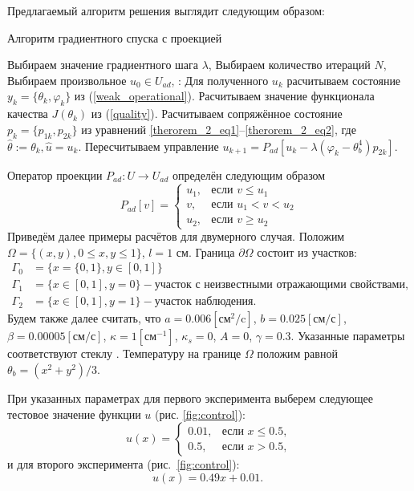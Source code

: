 Предлагаемый алгоритм решения выглядит следующим образом:
\begin{algorithm}[H]
    \caption{Алгоритм градиентного спуска с проекцией}
    \begin{algorithmic}[1]
        \State Выбираем значение градиентного шага $\lambda$,
        \State Выбираем количество итераций $N$,
        \State Выбираем произвольное $u_0 \in U_{ad}$,
            :
            \State Для полученного $u_k$ расчитываем состояние $y_k = \{\theta_k, \varphi_k\}$ из  (\ref{weak_operational}).
            \State Расчитываем значение функционала качества $J(\theta_k)$ из (\ref{quality}).
            \State Расчитываем сопряжённое состояние $p_k=\{p_{1k},p_{2k}\}$ из уравнений \eqref{therorem_2_eq1}--\eqref{therorem_2_eq2}, где $ \hat{\theta} := \theta_k, \hat{u}=u_k$.
            \State Пересчитываем управление $u_{k+1} = P_{ad}\left[ u_k - \lambda (\varphi_k - \theta_b^4)p_{2k} \right]$.
        \EndFor
    \end{algorithmic}\label{alg:algorithm}
\end{algorithm}
Оператор проекции $P_{ad} : U \to U_{ad}$ определён следующим образом
\[
    P_{ad}[v] =
    \begin{cases}
        u_1, & \text{если } v \le u_1 \\
        v, & \text{если } u_1 < v < u_2 \\
        u_2, & \text{если } v \ge u_2
    \end{cases}
\]
Приведём далее примеры расчётов для двумерного случая.
Положим $\Omega = \{(x,y), 0 \leq x,y \leq 1\}$, $l = 1$ см.
Граница $\partial\Omega$ состоит из участков:
\[
    \begin{aligned}
        \Gamma_0 & = \{x=\{0,1\}, y \in [0,1]\} \\
        \Gamma_1 & = \{x\in [0,1], y=0\} - \text{участок с неизвестными отражающими свойствами,} \\
        \Gamma_2 & = \{x \in [0,1], y=1\} - \text{участок наблюдения.}
    \end{aligned}
\]
Будем также далее считать, что $a = 0.006[\text{см}^2/\text{c}]$, $b=0.025[\text{см}/\text{с}]$, $\beta = 0.00005[\text{см}/\text{с}]$, $\kappa=1[\text{см}^{-1}]$, $\kappa_s = 0$, $A = 0$, $\gamma = 0.3$.
Указанные параметры соответствуют стеклу \cite{grenkin_13}.
Температуру на границе $\Omega$ положим равной $\theta_b = (x^2+y^2)/3$.

При указанных параметрах для первого эксперимента выберем следующее тестовое значение
функции $u$ (рис. \ref{fig:control}):
\begin{equation}
    u(x)=
    \begin{cases}
        0.01, & \text{если } x \le 0.5, \\
        0.5, & \text{если } x > 0.5,
    \end{cases}\label{eq:equation}
\end{equation}
и для второго эксперимента (рис.~\ref{fig:control}):
\begin{equation}
    \label{eq:test_function_1}
    u(x)=0.49x+0.01. \;
\end{equation}

